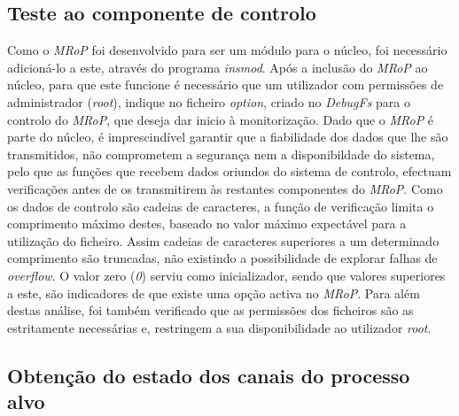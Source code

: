 \subsection{Teste ao componente de controlo}

Como o \textit{MRoP} foi desenvolvido para ser um módulo para o núcleo, foi necessário adicioná-lo a este, através do programa \textit{insmod}.
Após a inclusão do \textit{MRoP} ao núcleo, para que este funcione é necessário que um utilizador com permissões de administrador (\textit{root}), indique no ficheiro \textit{option}, criado no \textit{DebugFs} para o controlo do \textit{MRoP}, que deseja dar inicio à monitorização.
Dado que o \textit{MRoP} é parte do núcleo, é imprescindível garantir que a fiabilidade dos dados que lhe são transmitidos, não comprometem a segurança nem a disponibildade do sistema, pelo que as funções que recebem dados oriundos do sistema de controlo, efectuam verificações antes de os transmitirem às restantes componentes do \textit{MRoP}.
Como os dados de controlo são cadeias de caracteres, a função de verificação limita o comprimento máximo destes, baseado no valor máximo expectável para a utilização do ficheiro.
Assim cadeias de caracteres superiores a um determinado comprimento são truncadas, não existindo a possibilidade de explorar falhas de \textit{overflow}.
O valor zero (\textit{0}) serviu como inicializador, sendo que valores superiores a este, são indicadores de que existe uma opção activa no \textit{MRoP}.
Para além destas análise, foi também verificado que as permissões dos ficheiros são as estritamente necessárias e, restringem a sua disponibilidade ao utilizador \textit{root}.

\subsection{Obtenção do estado dos canais do processo alvo}

